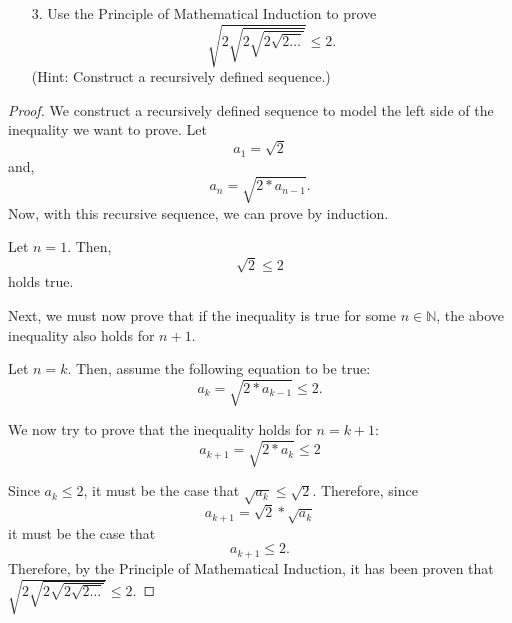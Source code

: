 \documentclass[10pt]{article}
\theoremstyle{definition}
\theoremstyle{plain}
\newcommand{\N}{\mathbb{N}}
\begin{document}
\pagebreak



\begin{enumerate}
  \item[3.] Use the Principle of Mathematical Induction to prove
  $$\sqrt{2\sqrt{2\sqrt{2\sqrt{2\dots}}}} \leq 2.$$
  (Hint:  Construct a recursively defined sequence.)
\end{enumerate}

\setcounter{equation}{0}
\begin{proof}
  We construct a recursively defined sequence to model the left side of the inequality we want to prove. Let
    $$a_1 = \sqrt{2}$$ and,
    $$a_n = \sqrt{2*a_{n-1}}.$$
    Now, with this recursive sequence, we can prove by induction.

  Let $n=1$. Then,
  \begin{equation}
    \sqrt{2} \leq 2
  \end{equation}
  holds true.

  \par Next, we must now prove that if the inequality is true for some $n\in\N$, the above inequality also holds for $n+1$.

  \par Let $n=k$. Then, assume the following equation to be true:
  \begin{equation}
    a_k = \sqrt{2*a_{k-1}} \leq 2.
  \end{equation}

  \par We now try to prove that the inequality holds for $n=k+1$:
  \begin{equation}
    a_{k+1} = \sqrt{2*a_{k}} \leq 2
  \end{equation}

  \par Since $a_k \leq 2$, it must be the case that $\sqrt{a_k} \leq \sqrt{2}.$ Therefore, since
  \begin{equation}
    a_{k+1} = \sqrt{2}*\sqrt{a_{k}}
  \end{equation}
  it must be the case that
  \begin{equation}
    a_{k+1} \leq 2.
  \end{equation}
  Therefore, by the Principle of Mathematical Induction, it has been proven that $\sqrt{2\sqrt{2\sqrt{2\sqrt{2\dots}}}} \leq 2.$
\end{proof}



\pagebreak
\end{document}
